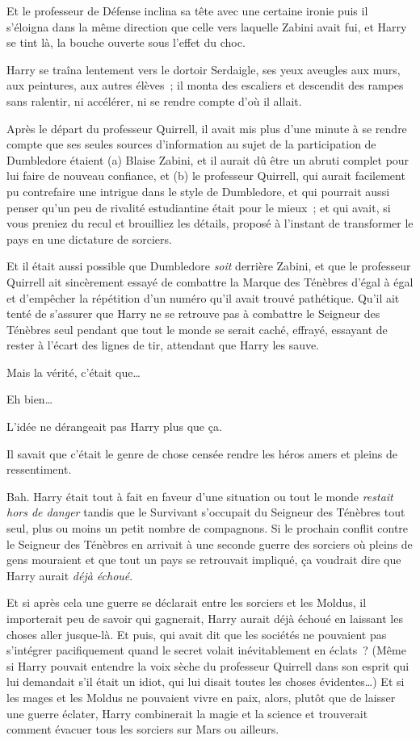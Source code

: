 Et le professeur de Défense inclina sa tête avec une certaine ironie puis il s'éloigna dans la même direction que celle vers laquelle Zabini avait fui, et Harry se tint là, la bouche ouverte sous l'effet du choc.


Harry se traîna lentement vers le dortoir Serdaigle, ses yeux aveugles aux murs, aux peintures, aux autres élèves~; il monta des escaliers et descendit des rampes sans ralentir, ni accélérer, ni se rendre compte d'où il allait.

Après le départ du professeur Quirrell, il avait mis plus d'une minute à se rendre compte que ses seules sources d'information au sujet de la participation de Dumbledore étaient (a) Blaise Zabini, et il aurait dû être un abruti complet pour lui faire de nouveau confiance, et (b) le professeur Quirrell, qui aurait facilement pu contrefaire une intrigue dans le style de Dumbledore, et qui pourrait aussi penser qu'un peu de rivalité estudiantine était pour le mieux~; et qui avait, si vous preniez du recul et brouilliez les détails, proposé à l'instant de transformer le pays en une dictature de sorciers.

Et il était aussi possible que Dumbledore \emph{soit} derrière Zabini, et que le professeur Quirrell ait sincèrement essayé de combattre la Marque des Ténèbres d'égal à égal et d'empêcher la répétition d'un numéro qu'il avait trouvé pathétique. Qu'il ait tenté de s'assurer que Harry ne se retrouve pas à combattre le Seigneur des Ténèbres seul pendant que tout le monde se serait caché, effrayé, essayant de rester à l'écart des lignes de tir, attendant que Harry les sauve.

Mais la vérité, c'était que…

Eh bien…

L'idée ne dérangeait pas Harry plus que ça.

Il savait que c'était le genre de chose censée rendre les héros amers et pleins de ressentiment.

Bah. Harry était tout à fait en faveur d'une situation ou tout le monde \emph{restait hors de danger} tandis que le Survivant s'occupait du Seigneur des Ténèbres tout seul, plus ou moins un petit nombre de compagnons. Si le prochain conflit contre le Seigneur des Ténèbres en arrivait à une seconde guerre des sorciers où pleins de gens mouraient et que tout un pays se retrouvait impliqué, ça voudrait dire que Harry aurait \emph{déjà échoué}.

Et si après cela une guerre se déclarait entre les sorciers et les Moldus, il importerait peu de savoir qui gagnerait, Harry aurait déjà échoué en laissant les choses aller jusque-là. Et puis, qui avait dit que les sociétés ne pouvaient pas s'intégrer pacifiquement quand le secret volait inévitablement en éclats~? (Même si Harry pouvait entendre la voix sèche du professeur Quirrell dans son esprit qui lui demandait s'il était un idiot, qui lui disait toutes les choses évidentes…) Et si les mages et les Moldus ne pouvaient vivre en paix, alors, plutôt que de laisser une guerre éclater, Harry combinerait la magie et la science et trouverait comment évacuer tous les sorciers sur Mars ou ailleurs.

